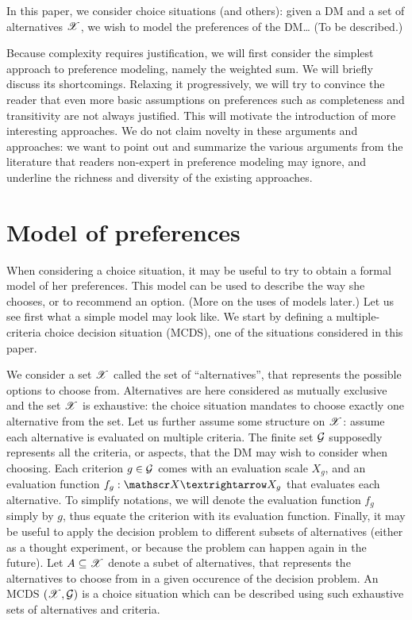 \documentclass[french, english]{llncs}
\begin{document}
In this paper, we consider choice situations (and others): given a \ac{DM} and a set of alternatives $\mathscr{X}$, we wish to model the preferences of the \ac{DM}… (To be described.)

Because complexity requires justification, we will first consider the simplest approach to preference modeling, namely the weighted sum. We will briefly discuss its shortcomings. Relaxing it progressively, we will try to convince the reader that even more basic assumptions on preferences such as completeness and transitivity are not always justified. This will motivate the introduction of more interesting approaches. We do not claim novelty in these arguments and approaches: we want to point out and summarize the various arguments from the literature that readers non-expert in preference modeling may ignore, and underline the richness and diversity of the existing approaches.  

\section{Model of preferences}
When considering a choice situation, it may be useful to try to obtain a formal model of her preferences. This model can be used to describe the way she chooses, or to recommend an option. (More on the uses of models later.) Let us see first what a simple model may look like. We start by defining a multiple-criteria choice decision situation (MCDS), one of the situations considered in this paper.

We consider a set $\mathscr{X}$ called the set of “alternatives”, that represents the possible options to choose from. Alternatives are here considered as mutually exclusive and the set $\mathscr{X}$ is exhaustive: the choice situation mandates to choose exactly one alternative from the set. Let us further assume some structure on $\mathscr{X}$: assume each alternative is evaluated on multiple criteria. The finite set $\mathcal{G}$ supposedly represents all the criteria, or aspects, that the \ac{DM} may wish to consider when choosing. Each criterion $g \in \mathcal{G}$ comes with an evaluation scale $X_g$, and an evaluation function $f_g: \allalts → X_g$ that evaluates each alternative. To simplify notations, we will denote the evaluation function $f_g$ simply by $g$, thus equate the criterion with its evaluation function. Finally, it may be useful to apply the decision problem to different subsets of alternatives (either as a thought experiment, or because the problem can happen again in the future). Let $A \subseteq \mathscr{X}$ denote a subet of alternatives, that represents the alternatives to choose from in a given occurence of the decision problem. An MCDS $(\mathscr{X}, \mathcal{G})$ is a choice situation which can be described using such exhaustive sets of alternatives and criteria.
\end{document}
